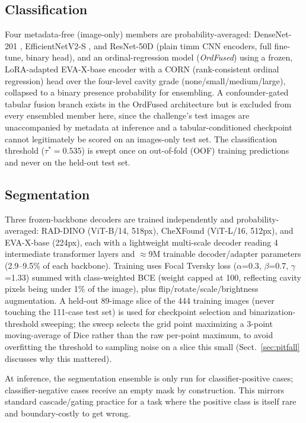 \documentclass[runningheads]{llncs}
\begin{document}
\subsection{Classification}

Four metadata-free (image-only) members are probability-averaged:
DenseNet-201 \cite{densenet}, EfficientNetV2-S \cite{effnetv2}, and
ResNet-50D \cite{resnet} (plain timm \cite{timm} CNN encoders, full
fine-tune, binary head), and an ordinal-regression model (\emph{OrdFused})
using a frozen, LoRA-adapted \cite{lora} EVA-X-base \cite{evax} encoder
with a CORN (rank-consistent ordinal regression) head \cite{corn} over the
four-level cavity grade (none/small/medium/large), collapsed to a binary
presence probability for ensembling. A confounder-gated tabular fusion
branch exists in the OrdFused architecture but is excluded from every
ensembled member here, since the challenge's test images are unaccompanied
by metadata at inference and a tabular-conditioned checkpoint cannot
legitimately be scored on an images-only test set. The classification
threshold ($\tau^*=0.535$) is swept once on out-of-fold (OOF) training
predictions and never on the held-out test set.

\subsection{Segmentation}

Three frozen-backbone decoders are trained independently and
probability-averaged: RAD-DINO (ViT-B/14, 518px), CheXFound (ViT-L/16,
512px), and EVA-X-base (224px), each with a lightweight multi-scale decoder
reading 4 intermediate transformer layers and $\approx$9M trainable
decoder/adapter parameters (2.9--9.5\% of each backbone). Training uses
Focal Tversky loss ($\alpha$=0.3, $\beta$=0.7, $\gamma$=1.33) \cite{focaltversky}
summed with class-weighted BCE (weight capped at 100, reflecting cavity
pixels being under 1\% of the image), plus flip/rotate/scale/brightness
augmentation. A held-out 89-image slice of the 444 training images (never
touching the 111-case test set) is used for checkpoint selection and
binarization-threshold sweeping; the sweep selects the grid point maximizing
a 3-point moving-average of Dice rather than the raw per-point maximum, to
avoid overfitting the threshold to sampling noise on a slice this small
(Sect.~\ref{sec:pitfall} discusses why this mattered).

At inference, the segmentation ensemble is only run for classifier-positive
cases; classifier-negative cases receive an empty mask by construction. This
mirrors standard cascade/gating practice for a task where the positive class
is itself rare and boundary-costly to get wrong.
\end{document}
